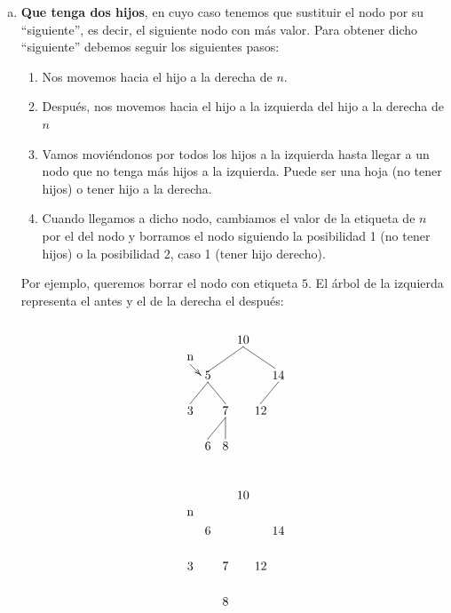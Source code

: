 \documentclass[10pt,a4paper,spanish]{report}
\begin{document}
\begin{description}
\begin{enumerate}[a)]
\item \textbf{\textcolor[rgb]{0.3,0.4,0.8}{Que tenga dos hijos}}, en cuyo caso tenemos que sustituir el nodo por su ``siguiente'', es decir, el siguiente nodo con más valor. Para obtener dicho ``siguiente'' debemos seguir los siguientes pasos:
\begin{enumerate}[1.]
      \item Nos movemos hacia el hijo a la derecha de $n$.
      \item Después, nos movemos hacia el hijo a la izquierda del hijo a la derecha de $n$
      \item Vamos moviéndonos por todos los hijos a la izquierda hasta llegar a un nodo que no tenga más hijos a la izquierda. Puede ser una hoja (no tener hijos) o tener hijo a la derecha.
      \item Cuando llegamos a dicho nodo, cambiamos el valor de la etiqueta de $n$ por el del nodo y borramos el nodo siguiendo la posibilidad 1 (no tener hijos) o la posibilidad 2, caso 1 (tener hijo derecho).
\end{enumerate}

\noindent
Por ejemplo, queremos borrar el nodo con etiqueta $5$. El árbol de la izquierda representa el antes y el de la derecha el después:

\begin{minipage}{0.6\textwidth}
\[\begin{xy}
,(0,0)*+=<10mm>[]\txt<2cm>{10}
,(-15,-5)*+=<10mm>[]\txt<2cm>{n}
,(-10,-10)*+=<10mm>[]\txt<2cm>{5}
,(10,-10)*+=<10mm>[]\txt<2cm>{14}
,(-15,-20)*+=<10mm>[]\txt<2cm>{3}
,(-5,-20)*+=<10mm>[]\txt<2cm>{7}
,(5,-20)*+=<10mm>[]\txt<2cm>{12}
,(-10,-30)*+=<10mm>[]\txt<2cm>{6}
,(-5,-30)*+=<10mm>[]\txt<2cm>{8}

\ar@{->} (-15,-7);(-12,-10)
\ar@{-} (0,-2);(-10,-9) %
\ar@{-} (0,-2);(9,-8) %
\ar@{-} (-10,-12);(-15,-18) %
\ar@{-} (10,-12);(5,-18) %
\ar@{-} (-10,-12);(-5,-18) %
\ar@{-} (-5,-22);(-10,-28) %
\ar@{-} (-5,-22);(-5,-28) %
\end{xy}\]
\end{minipage}
\begin{minipage}{0.6\textwidth}
\[\begin{xy}
,(0,0)*+=<10mm>[]\txt<2cm>{10}
,(-15,-5)*+=<10mm>[]\txt<2cm>{n}
,(-10,-10)*+=<10mm>[]\txt<2cm>{6}
,(10,-10)*+=<10mm>[]\txt<2cm>{14}
,(-15,-20)*+=<10mm>[]\txt<2cm>{3}
,(-5,-20)*+=<10mm>[]\txt<2cm>{7}
,(5,-20)*+=<10mm>[]\txt<2cm>{12}
,(-5,-30)*+=<10mm>[]\txt<2cm>{8}


\end{xy}\]
\end{minipage}
\end{enumerate}
\end{description}
\end{document}
